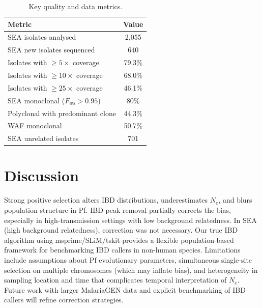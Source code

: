 \documentclass[11pt]{article}
\begin{document}
\begin{table}[h]
\centering
\caption{Key quality and data metrics.}
\begin{tabular}{lc}
\toprule
Metric & Value \\
\midrule
SEA isolates analysed & 2{,}055 \\
SEA new isolates sequenced & 640 \\
Isolates with $\geq 5\times$ coverage & 79.3\% \\
Isolates with $\geq 10\times$ coverage & 68.0\% \\
Isolates with $\geq 25\times$ coverage & 46.1\% \\
SEA monoclonal ($F_{ws}>0.95$) & 80\% \\
Polyclonal with predominant clone & 44.3\% \\
WAF monoclonal & 50.7\% \\
SEA unrelated isolates & 701 \\
\bottomrule
\end{tabular}
\end{table}

\section{Discussion}
Strong positive selection alters IBD distributions, underestimates $N_e$, and blurs population structure in Pf. IBD peak removal partially corrects the bias, especially in high-transmission settings with low background relatedness. In SEA (high background relatedness), correction was not necessary. Our true IBD algorithm using msprime/SLiM/tskit \citep{r52,r53,r83,r84} provides a flexible population-based framework for benchmarking IBD callers in non-human species. Limitations include assumptions about Pf evolutionary parameters, simultaneous single-site selection on multiple chromosomes (which may inflate bias), and heterogeneity in sampling location and time that complicates temporal interpretation of $N_e$. Future work with larger MalariaGEN data \citep{r86} and explicit benchmarking of IBD callers will refine correction strategies.



\end{document}
